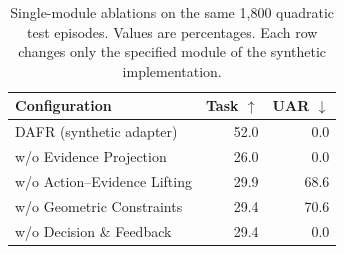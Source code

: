 \begin{table}[t]
\centering
\small
\setlength{\tabcolsep}{3pt}
\begin{tabular}{lrr}
\toprule
Configuration & Task $\uparrow$ & UAR $\downarrow$\\
\midrule
DAFR (synthetic adapter) & 52.0 & 0.0 \\
w/o Evidence Projection & 26.0 & 0.0 \\
w/o Action--Evidence Lifting & 29.9 & 68.6 \\
w/o Geometric Constraints & 29.4 & 70.6 \\
w/o Decision \& Feedback & 29.4 & 0.0 \\
\bottomrule
\end{tabular}
\caption{Single-module ablations on the same 1,800 quadratic test episodes. Values are percentages. Each row changes only the specified module of the synthetic implementation.}
\label{tab:synthetic-module-ablation}
\end{table}
